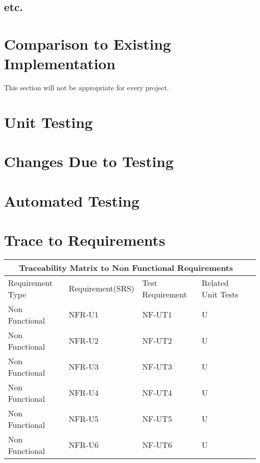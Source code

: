 \documentclass[12pt, titlepage]{article}
\begin{document}
\subsection{etc.}
	
\section{Comparison to Existing Implementation}	

This section will not be appropriate for every project.

\section{Unit Testing}

\section{Changes Due to Testing}

\section{Automated Testing}
		
\section{Trace to Requirements}
\begin{tabular}{ |p{3cm}||p{4cm}|p{4cm}|p{4cm}|p{4cm}| }
  \hline
  \multicolumn{4}{|c|}{Traceability Matrix to Non Functional Requirements} \\
  \hline
  Requirement Type & Requirement(SRS) & Test Requirement & Related Unit Tests \\
  \hline
  Non Functional   & NFR-U1  & NF-UT1 & U \\ \hline
  Non Functional   & NFR-U2  & NF-UT2 & U \\ \hline
  Non Functional   & NFR-U3  & NF-UT3 & U \\ \hline
  Non Functional   & NFR-U4  & NF-UT4 & U \\ \hline
  Non Functional   & NFR-U5  & NF-UT5 & U \\ \hline
  Non Functional   & NFR-U6  & NF-UT6 & U \\ \hline
  
 \end{tabular}
\end{document}
